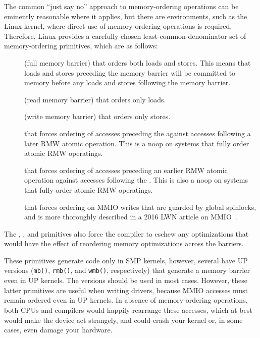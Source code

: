 The common ``just say no'' approach to memory-ordering operations
can be eminently reasonable where it applies,
but there are environments, such as the Linux kernel, where direct
use of memory-ordering operations is required.
Therefore,
Linux provides a carefully chosen least-common-denominator
set of memory-ordering primitives, which are as follows:
\begin{description}
\item	[] (full memory barrier) that orders both loads and
	stores.
	This means that loads and stores preceding the memory barrier
	will be committed to memory before any loads and stores
	following the memory barrier.
\item	[] (read memory barrier) that orders only loads.
\item	[] (write memory barrier) that orders only stores.
\item	[] that forces ordering of accesses
	preceding the  against accesses following
	a later RMW atomic operation.
	This is a noop on systems that fully order atomic RMW operatings.
\item	[] that forces ordering of accesses
	preceding an earlier RMW atomic operation against accesses
	following the .
	This is also a noop on systems that fully order atomic RMW operatings.
\item	[] that forces ordering on MMIO writes that are guarded
	by global spinlocks, and is more thoroughly described
	in a 2016 LWN article on MMIO~\cite{PaulEMcKenney2016LinuxKernelMMIO}.
\end{description}
The , , and 
primitives also force
the compiler to eschew any optimizations that would have the effect
of reordering memory optimizations across the barriers.

These primitives generate code only in SMP kernels, however, several
have UP versions ({\tt mb()}, {\tt rmb()}, and {\tt wmb()},
respectively) that generate a memory barrier even in UP kernels.
The  versions should be used in most cases.
However, these latter primitives are useful when writing drivers,
because MMIO accesses must remain ordered even in UP kernels.
In absence of memory-ordering operations, both CPUs and compilers would
happily rearrange these accesses, which at best would make the device
act strangely, and could crash your kernel or, in some cases, even damage
your hardware.

